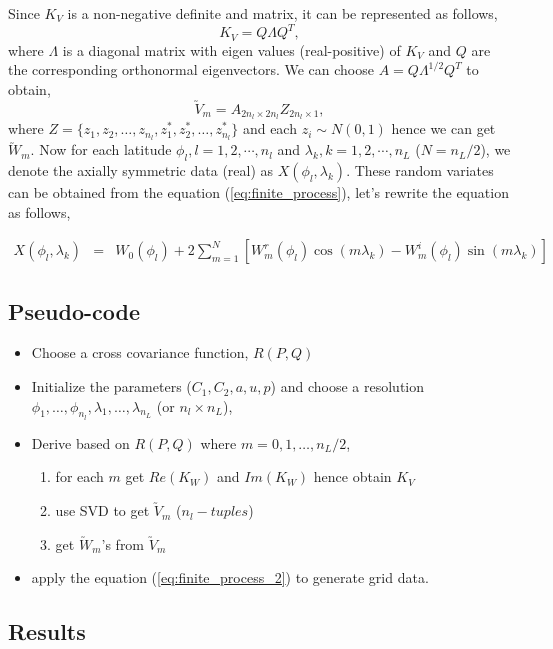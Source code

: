 	Since $K_V$ is a non-negative definite and matrix, it can be represented as follows,
	\[ K_V = Q\Lambda Q^T, \]
	where $\Lambda$ is a diagonal matrix with eigen values (real-positive) of $K_V$ and $Q$ are the corresponding orthonormal eigenvectors. We can choose $A = Q\Lambda^{1/2} Q^T$ to obtain,
	\[\utilde{V}_m=A_{2n_{l}\times 2n_{l}}Z_{2n_{l}\times 1},\]
	where $Z =\{z_1, z_2, \ldots, z_{n_l}, z_1^*, z_2^*, \ldots, z_{n_l}^*\}$ and each $z_i\sim N(0,1)$ hence we can get $\utilde{W}_m$.
	Now  for each latitude $\phi_l, l = 1, 2, \cdots, n_l$ and $\lambda_k, k = 1, 2, \cdots, n_L$ ($N = n_L/2$), we denote the axially symmetric data (real) as $X(\phi_l, \lambda_k)$. These random variates can be obtained from the equation (\ref{eq:finite_process}), let's rewrite the equation as follows,
		
	\begin{eqnarray} \label{eq:finite_process_2}
		X(\phi_l,\lambda_k) &=& W_0(\phi_l) + 2 \sum_{m =1}^N \left[W_m^r(\phi_l)\cos(m\lambda_k) - W_m^i(\phi_l)\sin(m \lambda_k)\right]
	\end{eqnarray}
		
	\subsection{Pseudo-code}
		
	\begin{itemize}
		\item Choose a cross covariance function, $R(P,Q)$
		\item Initialize the parameters ($C_1, C_2, a, u, p$) and choose a resolution $\phi_1,\ldots,\phi_{n_l}, \lambda_1, \ldots, \lambda_{n_L}$ (or $n_l\times n_L$),
		\item Derive \Cm based on $R(P,Q)$ where $m=0,1,\ldots,n_L/2$,
		      \begin{enumerate}
		      	\item for each $m$ get $Re(K_W)$ and $Im(K_W)$ hence obtain $K_V$
		      	\item use SVD to get $\utilde{V}_m$ ($n_l-tuples$)
		      	\item get $\utilde{W}_m$'s from $\utilde{V}_m$
		      \end{enumerate}
		      		      
		\item apply the equation (\ref{eq:finite_process_2}) to generate grid data.
	\end{itemize}
		
		
	\subsection{Results}
	
	
		
